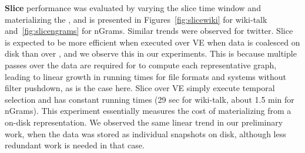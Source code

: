 {\bf Slice} performance was evaluated by varying the slice time window
and materializing the \tg, and is presented in
Figures~\ref{fig:slicewiki} for wiki-talk and~\ref{fig:slicengrams}
for nGrams.  Similar trends were observed for twitter.  Slice is
expected to be more efficient when executed over VE when data is
coalesced on disk than over \sg, and we observe this in our
experiments.  This is because multiple passes over the data are
required for \sg to compute each representative graph, leading to
linear growth in running times for file formats and systems without
filter pushdown, as is the case here.  Slice over VE simply execute
temporal selection and has constant running times (29 sec for
wiki-talk, about 1.5 min for nGrams). This experiment essentially measures the cost of
materializing \sg from a \ve on-disk representation.  We observed the
same linear trend in our preliminary work, when the data was stored as
individual snapshots on disk, although less redundant work is needed
in that case.


